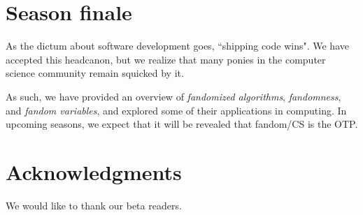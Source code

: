 \documentclass[9pt]{sigplanconf}
\begin{document}
\section{Season finale}
As the dictum about software development goes, ``shipping code
wins". We have accepted this headcanon, but we realize that many
ponies in the computer science community remain squicked by it.

As such, we have provided an overview of \emph{fandomized algorithms},
\emph{fandomness}, and \emph{fandom variables}, and explored some of
their applications in computing. In upcoming seasons, we expect that
it will be revealed that fandom/CS is the OTP.

\section*{Acknowledgments}
We would like to thank our beta readers.



\end{document}
